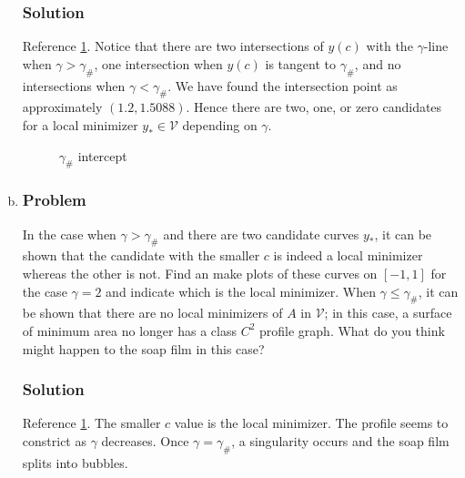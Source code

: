 \documentclass[12pt,twoside]{article}
\begin{document}
\begin{enumerate}[(a)]
\subsubsection*{Solution}
Reference \cref{fig:minilab.c-gamma-intercept}. Notice that there are two
intersections of $y(c)$ with the $\gamma$-line when
$\gamma>\gamma_{\#}$, one intersection when $y(c)$ is tangent to $\gamma_{\#}$,
and no intersections when $\gamma<\gamma_{\#}$. We have found the intersection
point as approximately $(1.2, 1.5088)$. Hence there are two, one, or zero
candidates for a local minimizer $y_*\in\mathcal{V}$ depending on $\gamma$.
\begin{figure}
  \centering
  \caption{$\gamma_{\#}$ intercept}
  \label{fig:minilab.c-gamma-intercept}
\end{figure}

\item
\subsubsection*{Problem}
In the case when $\gamma > \gamma_{\#}$ and there are two candidate curves
$y_*$, it can be shown that the candidate with the smaller $c$ is indeed a local
minimizer whereas the other is not. Find an make plots of these curves on
$[-1,1]$ for the case $\gamma=2$ and indicate which is the local minimizer. When
$\gamma\le\gamma_{\#}$, it can be shown that there are no local minimizers of
$A$ in $\mathcal{V}$; in this case, a surface of minimum area no longer has a
class $C^2$ profile graph. What do you think might happen to the soap film in
this case?

\subsubsection*{Solution}
Reference \cref{fig:minilab.c-gamma-intercept}. The smaller $c$ value is the
local minimizer. The profile seems to constrict as $\gamma$ decreases. Once
$\gamma=\gamma_{\#}$, a singularity occurs and the soap film splits into
bubbles.

\end{enumerate}
\end{document}
